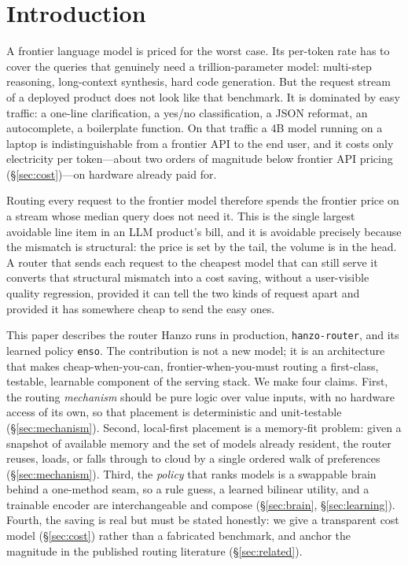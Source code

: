 \documentclass[11pt]{article}
\begin{document}
\section{Introduction}
\label{sec:intro}

A frontier language model is priced for the worst case. Its per-token rate has
to cover the queries that genuinely need a trillion-parameter model: multi-step
reasoning, long-context synthesis, hard code generation. But the request stream
of a deployed product does not look like that benchmark. It is dominated by
easy traffic: a one-line clarification, a yes/no classification, a JSON reformat,
an autocomplete, a boilerplate function. On that traffic a 4B model running on a
laptop is indistinguishable from a frontier API to the end user, and it costs
only electricity per token---about two orders of magnitude below frontier API
pricing (\S\ref{sec:cost})---on hardware already paid for.

Routing every request to the frontier model therefore spends the frontier price
on a stream whose median query does not need it. This is the single largest
avoidable line item in an LLM product's bill, and it is avoidable precisely
because the mismatch is structural: the price is set by the tail, the volume is
in the head. A router that sends each request to the cheapest model that can
still serve it converts that structural mismatch into a cost saving, without a
user-visible quality regression, provided it can tell the two kinds of request
apart and provided it has somewhere cheap to send the easy ones.

This paper describes the router Hanzo runs in production, \texttt{hanzo-router},
and its learned policy \texttt{enso}. The contribution is not a new model; it is
an architecture that makes cheap-when-you-can, frontier-when-you-must routing a
first-class, testable, learnable component of the serving stack. We make four
claims. First, the routing \emph{mechanism} should be pure logic over value
inputs, with no hardware access of its own, so that placement is deterministic
and unit-testable (\S\ref{sec:mechanism}). Second, local-first placement is a
memory-fit problem: given a snapshot of available memory and the set of models
already resident, the router reuses, loads, or falls through to cloud by a
single ordered walk of preferences (\S\ref{sec:mechanism}). Third, the
\emph{policy} that ranks models is a swappable brain behind a one-method seam,
so a rule guess, a learned bilinear utility, and a trainable encoder are
interchangeable and compose (\S\ref{sec:brain}, \S\ref{sec:learning}). Fourth,
the saving is real but must be stated honestly: we give a transparent cost model
(\S\ref{sec:cost}) rather than a fabricated benchmark, and anchor the magnitude
in the published routing literature (\S\ref{sec:related}).
\end{document}
